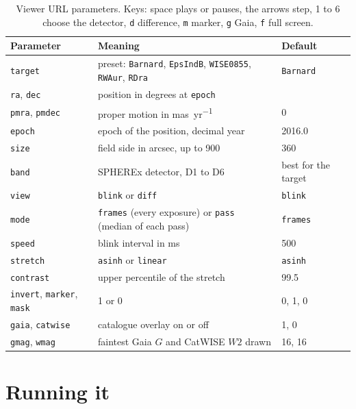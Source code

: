 \documentclass[11pt,a4paper]{article}
\begin{document}
\begin{table}[h]
\centering
\small
\begin{tabularx}{\linewidth}{@{}l X l@{}}
\toprule
Parameter & Meaning & Default \\
\midrule
\texttt{target} & preset: \texttt{Barnard}, \texttt{EpsIndB}, \texttt{WISE0855}, \texttt{RWAur}, \texttt{RDra} & \texttt{Barnard} \\
\texttt{ra}, \texttt{dec} & position in degrees at \texttt{epoch} & \\
\texttt{pmra}, \texttt{pmdec} & proper motion in \si{mas.yr^{-1}} & 0 \\
\texttt{epoch} & epoch of the position, decimal year & 2016.0 \\
\texttt{size} & field side in arcsec, up to 900 & 360 \\
\texttt{band} & SPHEREx detector, D1 to D6 & best for the target \\
\texttt{view} & \texttt{blink} or \texttt{diff} & \texttt{blink} \\
\texttt{mode} & \texttt{frames} (every exposure) or \texttt{pass} (median of each pass) & \texttt{frames} \\
\texttt{speed} & blink interval in ms & 500 \\
\texttt{stretch} & \texttt{asinh} or \texttt{linear} & \texttt{asinh} \\
\texttt{contrast} & upper percentile of the stretch & 99.5 \\
\texttt{invert}, \texttt{marker}, \texttt{mask} & 1 or 0 & 0, 1, 0 \\
\texttt{gaia}, \texttt{catwise} & catalogue overlay on or off & 1, 0 \\
\texttt{gmag}, \texttt{wmag} & faintest Gaia $G$ and CatWISE $W2$ drawn & 16, 16 \\
\bottomrule
\end{tabularx}
\caption{Viewer URL parameters. Keys: space plays or pauses, the arrows step, 1 to 6 choose the
detector, \texttt{d} difference, \texttt{m} marker, \texttt{g} Gaia, \texttt{f} full screen.}
\label{tab:params}
\end{table}

\section{Running it}
\end{document}

